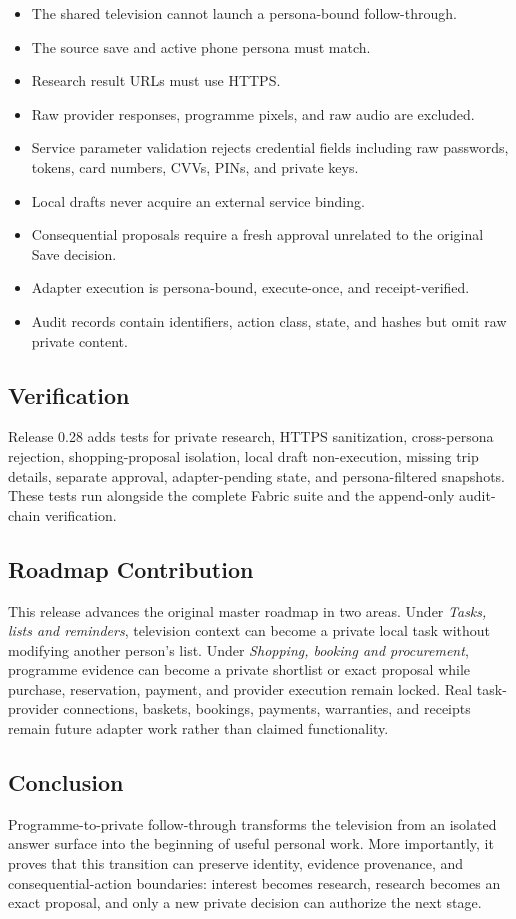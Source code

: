 \begin{itemize}
    \item The shared television cannot launch a persona-bound follow-through.
    \item The source save and active phone persona must match.
    \item Research result URLs must use HTTPS.
    \item Raw provider responses, programme pixels, and raw audio are excluded.
    \item Service parameter validation rejects credential fields including raw
    passwords, tokens, card numbers, CVVs, PINs, and private keys.
    \item Local drafts never acquire an external service binding.
    \item Consequential proposals require a fresh approval unrelated to the
    original Save decision.
    \item Adapter execution is persona-bound, execute-once, and receipt-verified.
    \item Audit records contain identifiers, action class, state, and hashes but
    omit raw private content.
\end{itemize}

\subsection{Verification}

Release 0.28 adds tests for private research, HTTPS sanitization, cross-persona
rejection, shopping-proposal isolation, local draft non-execution, missing trip
details, separate approval, adapter-pending state, and persona-filtered snapshots.
These tests run alongside the complete Fabric suite and the append-only audit-
chain verification.

\subsection{Roadmap Contribution}

This release advances the original master roadmap in two areas.  Under
\emph{Tasks, lists and reminders}, television context can become a private local
task without modifying another person's list.  Under \emph{Shopping, booking
and procurement}, programme evidence can become a private shortlist or exact
proposal while purchase, reservation, payment, and provider execution remain
locked.  Real task-provider connections, baskets, bookings, payments, warranties,
and receipts remain future adapter work rather than claimed functionality.

\subsection{Conclusion}

Programme-to-private follow-through transforms the television from an isolated
answer surface into the beginning of useful personal work.  More importantly,
it proves that this transition can preserve identity, evidence provenance, and
consequential-action boundaries: interest becomes research, research becomes an
exact proposal, and only a new private decision can authorize the next stage.
